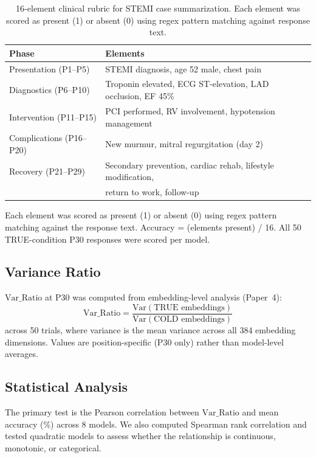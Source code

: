 \documentclass[11pt,a4paper]{article}
\begin{document}
\begin{table}[H]
\centering
\begin{tabular}{ll}
\toprule
\textbf{Phase} & \textbf{Elements} \\
\midrule
Presentation (P1--P5) & STEMI diagnosis, age 52 male, chest pain \\
Diagnostics (P6--P10) & Troponin elevated, ECG ST-elevation, LAD occlusion, EF 45\% \\
Intervention (P11--P15) & PCI performed, RV involvement, hypotension management \\
Complications (P16--P20) & New murmur, mitral regurgitation (day 2) \\
Recovery (P21--P29) & Secondary prevention, cardiac rehab, lifestyle modification, \\
                     & return to work, follow-up \\
\bottomrule
\end{tabular}
\caption{16-element clinical rubric for STEMI case summarization. Each element was scored as present (1) or absent (0) using regex pattern matching against response text.}
\label{tab:rubric}
\end{table}

Each element was scored as present (1) or absent (0) using regex pattern matching against the response text. Accuracy = (elements present) / 16. All 50 TRUE-condition P30 responses were scored per model.

\subsection{Variance Ratio}

$\text{Var\_Ratio}$ at P30 was computed from embedding-level analysis (Paper~4):
\begin{equation}
\text{Var\_Ratio} = \frac{\text{Var}(\text{TRUE embeddings})}{\text{Var}(\text{COLD embeddings})}
\end{equation}
across 50 trials, where variance is the mean variance across all 384 embedding dimensions. Values are position-specific (P30 only) rather than model-level averages.

\subsection{Statistical Analysis}

The primary test is the Pearson correlation between $\text{Var\_Ratio}$ and mean accuracy (\%) across 8 models. We also computed Spearman rank correlation and tested quadratic models to assess whether the relationship is continuous, monotonic, or categorical.
\end{document}
